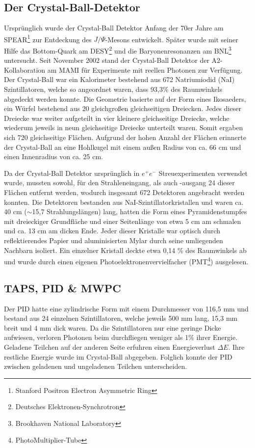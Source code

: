 \documentclass[a4paper,11pt,oneside,final,german,openbib,pdftex]{scrbook}
\begin{document}
{\subsection{Der Crystal-Ball-Detektor}
Ursprünglich wurde der Crystal-Ball Detektor Anfang der 70er Jahre am SPEAR\footnote{Stanford Positron Electron Asymmetric Ring} zur Entdeckung des $J/\Psi$-Mesons entwickelt. Später wurde mit seiner Hilfe das Bottom-Quark am DESY\footnote{Deutsches Elektronen-Synchrotron} und die Baryonenresonanzen am BNL\footnote{Brookhaven National Laboratory} untersucht.
Seit November 2002 stand der Crystal-Ball Detektor der A2-Kollaboration am MAMI für Experimente mit reellen Photonen zur Verfügung.
\newline
Der Crystal-Ball war ein Kalorimeter bestehend aus 672 Natriumiodid (NaI) Szintillatoren, welche so angeordnet waren, dass 93,3\% des Raumwinkels abgedeckt werden konnte. Die Geometrie basierte auf der Form eines Ikosaeders, ein W\"urfel bestehend aus 20 gleichgro{\ss}en  gleichseitigen Dreiecken. Jedes dieser Dreiecke war weiter aufgeteilt in vier kleinere gleichseitige Dreiecke, welche wiederum jeweils in neun gleichseitige Dreiecke unterteilt waren. Somit ergaben sich 720 gleichseitige Fl\"achen. Aufgrund der hohen Anzahl der Fl\"achen erinnerte der Crystal-Ball an eine Hohlkugel mit einem au{\ss}en Radius von ca. 66 cm und einen Innenradius von ca. 25 cm. 

Da der Crystal-Ball Detektor urspr\"unglich in $e^+e^-$ Streuexperimenten verwendet wurde, mussten sowohl, f\"ur den Strahleneingang, als auch -ausgang 24 dieser Fl\"achen entfernt werden, wodurch insgesamt 672 Detektoren angebracht werden konnten. Die Detektoren bestanden aus NaI-Szintillatorkristallen und waren ca. 40 cm ($\sim$15,7 Strahlungsl\"angen) lang, hatten die Form eines Pyramidenstumpfes mit dreieckiger Grundfl\"ache und einer Seitenl\"ange von etwa 5 cm am schmalen und ca. 13 cm am dicken Ende. Jeder dieser Kristalle war optisch durch reflektierendes Papier und aluminisierten Mylar durch seine umliegenden Nachbarn isoliert. Ein einzelner Kristall deckte etwa 0,14 \% des Raumwinkels ab und wurde durch einen eigenen Photoelektronenvervielfacher (PMT\footnote{PhotoMultiplier-Tube}) ausgelesen. 



\subsection{TAPS, PID \& MWPC}
\label{sec:TAPS-PID-MWPC}
Der PID hatte eine zylindrische Form mit einem Durchmesser von 116,5 mm und bestand aus 24 einzelnen Szintillatoren, welche jeweils 500 mm lang, 15,3 mm breit und 4 mm dick waren. Da die Szintillatoren nur eine geringe Dicke aufwiesen, verloren Photonen beim durchfliegen weniger als 1\% ihrer Energie. Geladene Teilchen auf der anderen Seite erfuhren einen Energieverlust $\Delta E$. Ihre restliche Energie wurde im Crystal-Ball abgegeben. Folglich konnte der PID zwischen geladenen und ungeladenen Teilchen unterscheiden. 

}
\end{document}
